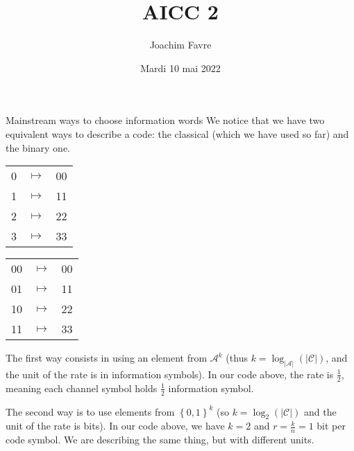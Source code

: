 \documentclass[a4paper]{article}
\title{AICC 2}
\author{Joachim Favre}
\date{Mardi 10 mai 2022}
\begin{document}
\maketitle


\begin{parag}{Mainstream ways to choose information words}
    We notice that we have two equivalent ways to describe a code: the classical (which we have used so far) and the binary one.
    \begin{center}
    \begin{tabular}{ccc}
        0 & $\mapsto$ & 00 \\
        1 & $\mapsto$ & 11 \\
        2 & $\mapsto$ & 22 \\
        3 & $\mapsto$ & 33 \\
    \end{tabular}
    \hspace{5em}
    \begin{tabular}{ccc}
        00 & $\mapsto$ & 00 \\
        01 & $\mapsto$ & 11 \\
        10 & $\mapsto$ & 22 \\
        11 & $\mapsto$ & 33 \\
    \end{tabular}
    \end{center}

    The first way consists in using an element from $\mathcal{A}^k$ (thus $k = \log_{\left|\mathcal{A}\right|}\left(\left|\mathcal{C}\right|\right)$, and the unit of the rate is in information symbols). In our code above, the rate is $\frac{1}{2}$, meaning each channel symbol holds $\frac{1}{2}$ information symbol.

    The second way is to use elements from $\left\{0, 1\right\}^k$ (so $k = \log_2\left(\left|\mathcal{C}\right|\right)$ and the unit of the rate is bits). In our code above, we have $k = 2$ and $r = \frac{k}{n} = 1$ bit per code symbol. We are describing the same thing, but with different units.
\end{parag}
\end{document}
